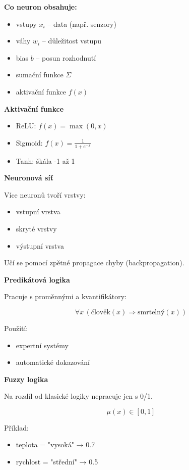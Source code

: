 \documentclass[a4paper,10pt]{article}
\begin{document}
\begin{vysvetlenibox}
\textbf{Co neuron obsahuje:}
\begin{itemize}
\item vstupy $x_i$ – data (např. senzory)
\item váhy $w_i$ – důležitost vstupu
\item bias $b$ – posun rozhodnutí
\item sumační funkce $\Sigma$
\item aktivační funkce $f(x)$
\end{itemize}

\textbf{Aktivační funkce}

\begin{itemize}
\item ReLU: $f(x)=\max(0,x)$
\item Sigmoid: $f(x)=\frac{1}{1+e^{-x}}$
\item Tanh: škála -1 až 1
\end{itemize}

\textbf{Neuronová síť}

Více neuronů tvoří vrstvy:
\begin{itemize}
\item vstupní vrstva
\item skryté vrstvy
\item výstupní vrstva
\end{itemize}

Učí se pomocí zpětné propagace chyby (backpropagation).

\textbf{Predikátová logika}

Pracuje s proměnnými a kvantifikátory:

\[
\forall x \, (\text{člověk}(x) \Rightarrow \text{smrtelný}(x))
\]

Použití:
\begin{itemize}
\item expertní systémy
\item automatické dokazování
\end{itemize}

\textbf{Fuzzy logika}

Na rozdíl od klasické logiky nepracuje jen s 0/1.

\[
\mu(x) \in [0,1]
\]

Příklad:
\begin{itemize}
\item teplota = "vysoká" → 0.7
\item rychlost = "střední" → 0.5
\end{itemize}


\end{vysvetlenibox}
\end{document}
